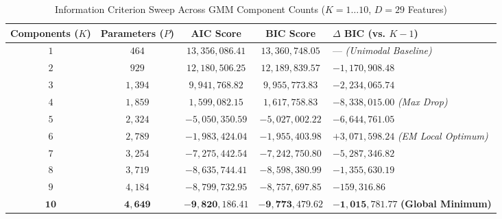 \documentclass[11pt, a4paper]{article}
\begin{document}
\begin{table}[h!]
\centering
\caption{Information Criterion Sweep Across GMM Component Counts ($K = 1 \dots 10$, $D = 29$ Features)}
\vspace{0.2cm}
\renewcommand{\arraystretch}{1.22}
\begin{tabular}{ccccl}
\toprule
\rowcolor{tableheader}
\textbf{Components ($K$)} & \textbf{Parameters ($P$)} & \textbf{AIC Score} & \textbf{BIC Score} & \textbf{$\Delta$ BIC (vs. $K-1$)} \\
\midrule
$1$ & $464$ & $13,356,086.41$ & $13,360,748.05$ & --- \textit{(Unimodal Baseline)} \\
\rowcolor{rowalt}
$2$ & $929$ & $12,180,506.25$ & $12,189,839.57$ & $-1,170,908.48$ \\
$3$ & $1,394$ & $9,941,768.82$ & $9,955,773.83$ & $-2,234,065.74$ \\
\rowcolor{rowalt}
$4$ & $1,859$ & $1,599,082.15$ & $1,617,758.83$ & $-8,338,015.00$ \textit{(Max Drop)} \\
$5$ & $2,324$ & $-5,050,350.59$ & $-5,027,002.22$ & $-6,644,761.05$ \\
\rowcolor{rowalt}
$6$ & $2,789$ & $-1,983,424.04$ & $-1,955,403.98$ & $+3,071,598.24$ \textit{(EM Local Optimum)} \\
$7$ & $3,254$ & $-7,275,442.54$ & $-7,242,750.80$ & $-5,287,346.82$ \\
\rowcolor{rowalt}
$8$ & $3,719$ & $-8,635,744.41$ & $-8,598,380.99$ & $-1,355,630.19$ \\
$9$ & $4,184$ & $-8,799,732.95$ & $-8,757,697.85$ & $-159,316.86$ \\
\rowcolor{rowalt}
$\mathbf{10}$ & $\mathbf{4,649}$ & $\mathbf{-9,820,186.41}$ & $\mathbf{-9,773,479.62}$ & $\mathbf{-1,015,781.77}$ \textbf{(Global Minimum)} \\
\bottomrule
\end{tabular}
\label{tab:aic_bic}
\end{table}
\end{document}
